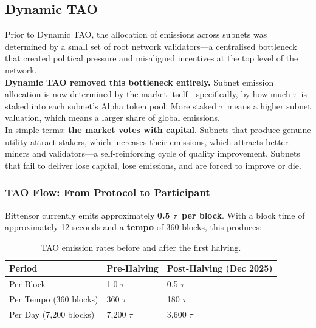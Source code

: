 \documentclass[12pt, a4paper, oneside]{report}
\newcommand{\TAO}{$\tau$}            %
\theoremstyle{definition}
\begin{document}
\subsection{Dynamic TAO}

Prior to Dynamic TAO, the allocation of emissions across subnets was determined 
by a small set of root network validators—a centralised bottleneck that created 
political pressure and misaligned incentives at the top level of the network.\\[0.4cm]

\textbf{Dynamic TAO removed this bottleneck entirely.} Subnet emission allocation 
is now determined by the market itself—specifically, by how much \TAO\ is staked 
into each subnet's Alpha token pool. More staked \TAO\ means a higher subnet 
valuation, which means a larger share of global emissions.\\[0.4cm]

In simple terms: \textbf{the market votes with capital}. Subnets that produce 
genuine utility attract stakers, which increases their emissions, which attracts 
better miners and validators—a self-reinforcing cycle of quality improvement. 
Subnets that fail to deliver lose capital, lose emissions, and are forced to 
improve or die.

\subsubsection*{TAO Flow: From Protocol to Participant}

Bittensor currently emits approximately \textbf{0.5 \TAO\ per block}. With a block time of 
approximately 12 seconds and a \textbf{tempo} of 360 blocks, this produces:

\begin{table}[H]
\centering
\renewcommand{\arraystretch}{1.5}
\begin{tabular}{lll}
\toprule
\textbf{Period} & \textbf{Pre-Halving} & \textbf{Post-Halving (Dec 2025)} \\
\midrule
Per Block  & 1.0 \TAO   & 0.5 \TAO   \\
Per Tempo (360 blocks) & 360 \TAO  & 180 \TAO   \\
Per Day (7,200 blocks) & 7,200 \TAO & 3,600 \TAO \\
\bottomrule
\end{tabular}
\caption{TAO emission rates before and after the first halving.}
\label{tab:emissions_rate}
\end{table}
\end{document}
